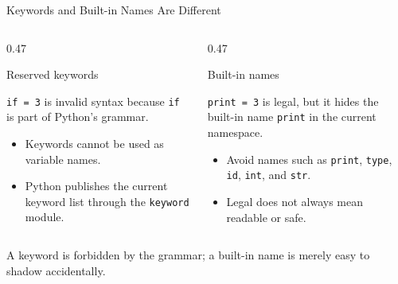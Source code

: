 \documentclass[aspectratio=169,10pt]{beamer}
\begin{document}
\begin{frame}{Keywords and Built-in Names Are Different}

  \begin{columns}[T,onlytextwidth]

    \begin{column}{0.47\textwidth}

      \begin{block}{Reserved keywords}

        \texttt{if = 3} is invalid syntax because \texttt{if} is part of Python's grammar.

      \end{block}

      \begin{itemize}

        \item Keywords cannot be used as variable names.

        \item Python publishes the current keyword list through the \texttt{keyword} module.

      \end{itemize}

    \end{column}

    \begin{column}{0.47\textwidth}

      \begin{block}{Built-in names}

        \texttt{print = 3} is legal, but it hides the built-in name \texttt{print} in the current namespace.

      \end{block}

      \begin{itemize}

        \item Avoid names such as \texttt{print}, \texttt{type}, \texttt{id}, \texttt{int}, and \texttt{str}.

        \item Legal does not always mean readable or safe.

      \end{itemize}

    \end{column}

  \end{columns}

  \begin{keyidea}

    A keyword is forbidden by the grammar; a built-in name is merely easy to shadow accidentally.

  \end{keyidea}

\end{frame}
\end{document}
